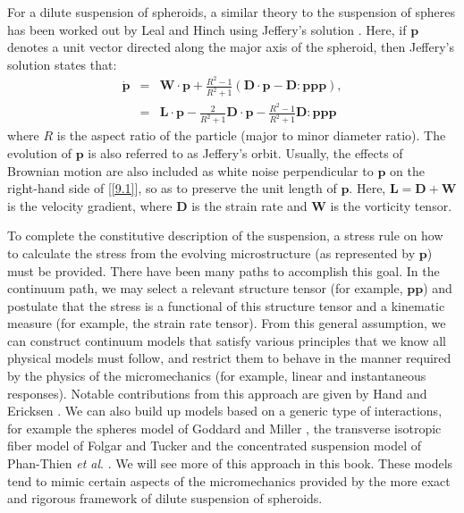 \documentclass[english,fleqn,allpages]{ISTE_science}[2018/07/30]
\begin{document}
For a dilute suspension of spheroids, a similar theory to the suspension
of spheres has been worked out by Leal and Hinch \cite{leal73} using
Jeffery's solution \cite{jeffery22}. Here, if $\mathbf{p}$ denotes
a unit vector directed along the major axis of the spheroid, then
Jeffery's solution states that: 
\begin{eqnarray}
\mathbf{\dot{p}} & =&\mathbf{W}\cdot\mathbf{p}+\frac{R^{2}-1}{R^{2}+1}\left(\mathbf{D}\cdot\mathbf{p}-\mathbf{D}:\mathbf{ppp}\right),\label{9.1}\\
 & =&\mathbf{L}\cdot\mathbf{p}-\frac{2}{R^{2}+1}\mathbf{D}\cdot\mathbf{p}-\frac{R^{2}-1}{R^{2}+1}\mathbf{D}:\mathbf{ppp}\nonumber 
\end{eqnarray}
where $R$ is the aspect ratio of the particle (major to minor diameter
ratio). The evolution of $\mathbf{p}$ is also referred to as Jeffery's
orbit. Usually, the effects of Brownian motion are also included as
white noise perpendicular to $\mathbf{p}$ on the right-hand side
of [\ref{9.1}], so as to preserve the unit length of $\mathbf{p}.$
Here, $\mathbf{L}=\mathbf{D}+\mathbf{W}$ is the velocity gradient,
where $\mathbf{D}$ is the strain rate and $\mathbf{W}$ is the vorticity
tensor.

To complete the constitutive description of the suspension, a stress
rule on how to calculate the stress from the evolving microstructure
(as represented by $\mathbf{p}$) must be provided. There have been
many paths to accomplish this goal. In the continuum path, we may
select a relevant structure tensor (for example, $\mathbf{pp}$) and
postulate that the stress is a functional of this structure tensor
and a kinematic measure (for example, the strain rate tensor). From
this general assumption, we can construct continuum models that satisfy
various principles that we know all physical models must follow, and
restrict them to behave in the manner required by the physics of the
micromechanics (for example, linear and instantaneous responses).
Notable contributions from this approach are given by Hand \cite{hand62}
and Ericksen \cite{ericksen60}. We can also build up models based
on a generic type of interactions, for example the spheres model of
Goddard and Miller \cite{goddard}, the transverse isotropic fiber
model of Folgar and Tucker \cite{folgar84} and the concentrated suspension
model of Phan-Thien \textit{et al}. \cite{phan-thien99}. We will
see more of this approach in this book. These models tend to mimic
certain aspects of the micromechanics provided by the more exact and
rigorous framework of dilute suspension of spheroids.
\end{document}
